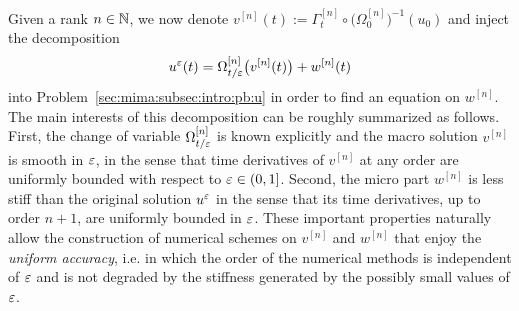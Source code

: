 Given a rank $n \in \mathbb{N}$, we now denote $v^{[n]}(t) := \Gamma_t^{[n]} \circ \big( \Omega^{[n]}_0 \big)^{-1}(u_0) $ 
and inject the decomposition 
\begin{equation} \label{sec:mima:subsec:ua:eq:mima}
u^{\varepsilon}(t) = \Omega_{t/\varepsilon}^{[n]} \big( v^{[n]}(t) \big) + w^{[n]}(t) 
\end{equation}
into Problem~\eqref{sec:mima:subsec:intro:pb:u} 
in order to find an equation on $w^{[n]}$. 
The main interests of this decomposition can be roughly summarized as follows. First, the change of variable $\Omega_{t/\varepsilon}^{[n]}$ is known explicitly  and the macro solution $v^{[n]}$ is smooth in $\varepsilon$, in the sense that time derivatives of $v^{[n]}$ at any order are uniformly bounded  with respect to $\varepsilon\in(0,1]$. Second,  the micro part $w^{[n]}$ is less stiff than the original solution $u^{\varepsilon}$ in the sense that its time derivatives, up to order $n+1$, are uniformly bounded in $\varepsilon$. These important properties naturally allow the construction of  numerical schemes on $v^{[n]}$  and $w^{[n]}$ that enjoy the \textit{uniform accuracy}, 
i.e. in which the order of the numerical methods is independent of $\varepsilon$ and is not degraded by the stiffness generated by the possibly small values of $\varepsilon$. 

